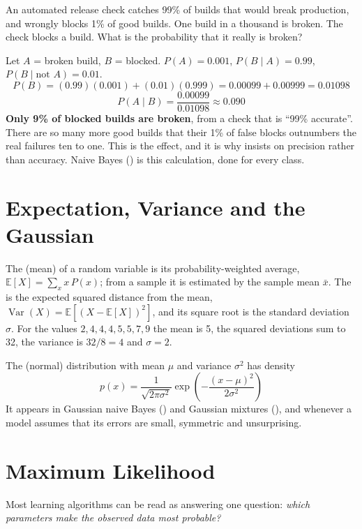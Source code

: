 \begin{worked}
An automated release check catches 99\% of builds that would break production,
and wrongly blocks 1\% of good builds. One build in a thousand is broken. The
check blocks a build. What is the probability that it really is broken?

\smallskip
Let $A$ = broken build, $B$ = blocked. $P(A) = 0.001$, $P(B\mid A) = 0.99$,
$P(B \mid \text{not }A) = 0.01$.
\[
P(B) = (0.99)(0.001) + (0.01)(0.999) = 0.00099 + 0.00999 = 0.01098
\]
\[
P(A \mid B) = \frac{0.00099}{0.01098} \approx \mathbf{0.090}
\]
\textbf{Only 9\% of blocked builds are broken}, from a check that is ``99\%
accurate''. There are so many more good builds that their 1\% of false blocks
outnumbers the real failures ten to one. This is the 
effect, and it is why  insists on precision rather than
accuracy. Naive Bayes () is this calculation, done for every class.
\end{worked}

\section{Expectation, Variance and the Gaussian}

The  (mean) of a random variable is its probability-weighted
average, $\mathbb{E}[X] = \sum_x x\,P(x)$; from a sample it is estimated by the
sample mean $\bar{x}$. The  is the expected squared distance from
the mean, $\operatorname{Var}(X) = \mathbb{E}[(X - \mathbb{E}[X])^2]$, and its
square root is the standard deviation $\sigma$. For the values $2, 4, 4, 4, 5, 5,
7, 9$ the mean is 5, the squared deviations sum to 32, the variance is
$32/8 = 4$ and $\sigma = 2$.

The  (normal) distribution with mean $\mu$ and variance
$\sigma^2$ has density
\[
p(x) = \frac{1}{\sqrt{2\pi\sigma^2}} \exp\!\left(-\frac{(x-\mu)^2}{2\sigma^2}\right)
\]
It appears in Gaussian naive Bayes () and Gaussian mixtures
(), and whenever a model assumes that its errors are small,
symmetric and unsurprising.

\section{Maximum Likelihood}

Most learning algorithms can be read as answering one question: \emph{which
parameters make the observed data most probable?}

